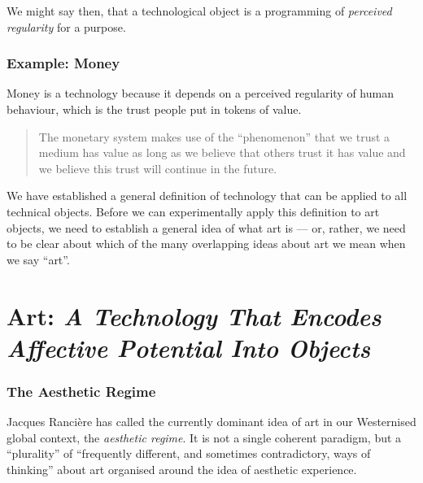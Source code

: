 \documentclass[letterpaper]{article}
\begin{document}
    We might say then, that a technological object is a programming of \emph{perceived regularity} for a purpose.

    \subsubsection{Example: Money}

    Money is a technology because it depends on a perceived regularity of human behaviour, which is the trust people put in tokens of value.

    \begin{quote}
        The monetary system makes use of the “phenomenon” that we trust a medium has value as long as we believe that others trust it has value and we believe this trust will continue in the future. \citep[p.55]{theNatureOfTechnology2009}
    \end{quote}

    We have established a general definition of technology that can be applied to all technical objects. Before we can experimentally apply this definition to art objects, we need to establish a general idea of what art is — or, rather, we need to be clear about which of the many overlapping ideas about art we mean when we say “art”.

\section{Art: \emph{A Technology That Encodes Affective Potential Into Objects}}

    \subsubsection{The Aesthetic Regime}

    Jacques Rancière has called the currently dominant idea of art in our Westernised global context, the \emph{aesthetic regime}. It is not a single coherent paradigm, but a “plurality” of “frequently different, and sometimes contradictory, ways of thinking” \citep[p.8]{RanciereMdrnTms2022} about art organised around the idea of aesthetic experience.
    
\end{document}
